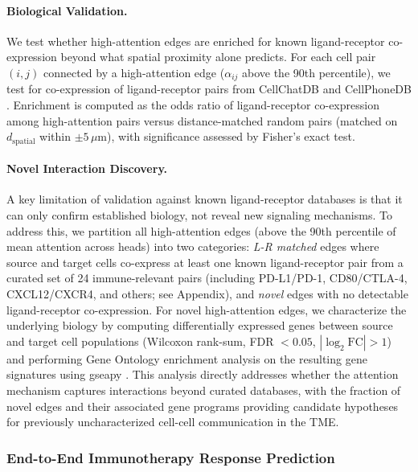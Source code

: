 \documentclass{article}
\begin{document}
\paragraph{Biological Validation.} We test whether high-attention edges are enriched for known ligand-receptor co-expression beyond what spatial proximity alone predicts. For each cell pair $(i, j)$ connected by a high-attention edge ($\alpha_{ij}$ above the 90th percentile), we test for co-expression of ligand-receptor pairs from CellChatDB \cite{jin2021inference} and CellPhoneDB \cite{efremova2020cellphonedb}. Enrichment is computed as the odds ratio of ligand-receptor co-expression among high-attention pairs versus distance-matched random pairs (matched on $d_{\text{spatial}}$ within $\pm 5\,\mu$m), with significance assessed by Fisher's exact test.

\paragraph{Novel Interaction Discovery.} A key limitation of validation against known ligand-receptor databases is that it can only confirm established biology, not reveal new signaling mechanisms. To address this, we partition all high-attention edges (above the 90th percentile of mean attention across heads) into two categories: \textit{L-R matched} edges where source and target cells co-express at least one known ligand-receptor pair from a curated set of 24 immune-relevant pairs (including PD-L1/PD-1, CD80/CTLA-4, CXCL12/CXCR4, and others; see Appendix), and \textit{novel} edges with no detectable ligand-receptor co-expression. For novel high-attention edges, we characterize the underlying biology by computing differentially expressed genes between source and target cell populations (Wilcoxon rank-sum, FDR $< 0.05$, $|\log_2\text{FC}| > 1$) and performing Gene Ontology enrichment analysis on the resulting gene signatures using gseapy \cite{subramanian2005gene}. This analysis directly addresses whether the attention mechanism captures interactions beyond curated databases, with the fraction of novel edges and their associated gene programs providing candidate hypotheses for previously uncharacterized cell-cell communication in the TME.


\subsubsection{End-to-End Immunotherapy Response Prediction}
\label{sec:prediction}
\end{document}
